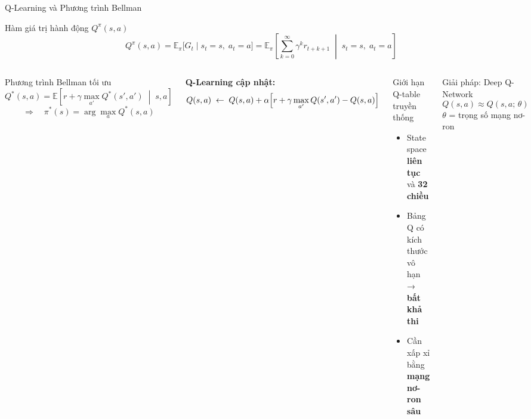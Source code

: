 \begin{frame}{Q-Learning và Phương trình Bellman}
  \begin{block}{Hàm giá trị hành động $Q^\pi(s,a)$}
    \[Q^\pi(s,a) = \mathbb{E}_\pi\bigl[G_t \mid s_t=s,\; a_t=a\bigr]
      = \mathbb{E}_\pi\!\left[\sum_{k=0}^{\infty}\gamma^k r_{t+k+1}\;\middle|\;s_t=s,\;a_t=a\right]\]
  \end{block}
  \vspace{6pt}
  \begin{columns}[T]
    \begin{block}{Phương trình Bellman tối ưu}
      \[Q^*(s,a) = \mathbb{E}\!\left[r + \gamma\max_{a'}Q^*(s',a')\;\middle|\;s,a\right]\]
      \[\Rightarrow\quad\pi^*(s) = \arg\max_a Q^*(s,a)\]
    \end{block}
    \vspace{4pt}
    \textbf{Q-Learning cập nhật:}
    \[Q(s,a)\;\leftarrow\; Q(s,a)+\alpha\Bigl[r+\gamma\max_{a'}Q(s',a')-Q(s,a)\Bigr]\]

    \begin{alertblock}{Giới hạn Q-table truyền thống}
      \begin{itemize}
        \item State space \textbf{liên tục} và \textbf{32 chiều}
        \item Bảng Q có kích thước vô hạn → \textbf{bất khả thi}
        \item[$\Rightarrow$] Cần xấp xỉ bằng \textbf{mạng nơ-ron sâu}
      \end{itemize}
    \end{alertblock}
    \vspace{6pt}
    \begin{exampleblock}{Giải pháp: Deep Q-Network}
      \[Q(s,a) \approx Q(s,a;\,\theta)\]
      $\theta$ = trọng số mạng nơ-ron
    \end{exampleblock}
  \end{columns}
\end{frame}

